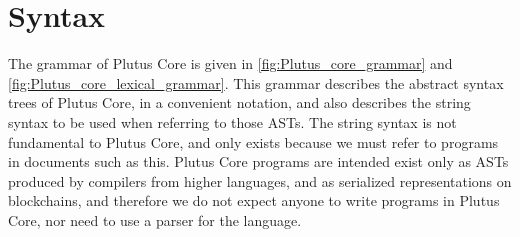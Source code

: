 \documentclass[a4paper]{article}
\begin{document}


\section{Syntax}

The grammar of Plutus Core is given in \ref{fig:Plutus_core_grammar} and
\ref{fig:Plutus_core_lexical_grammar}. This grammar describes the abstract
syntax trees of Plutus Core, in a convenient notation, and also describes
the string syntax to be used when referring to those ASTs. The string
syntax is not fundamental to Plutus Core, and only exists because we must
refer to programs in documents such as this. Plutus Core programs are
intended exist only as ASTs produced by compilers from higher languages,
and as serialized representations on blockchains, and therefore we do not
expect anyone to write programs in Plutus Core, nor need to use a parser
for the language.
\end{document}
